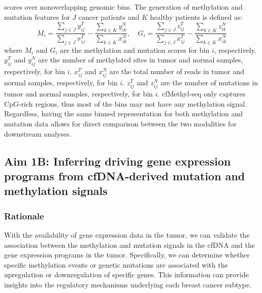 \documentclass[11pt]{article}
\begin{document}
scores over nonoverlapping genomic bins.
The generation of methylation and mutation features for $J$ cancer patients and $K$ healthy patients is defined as:
\begin{equation}
	M_{i} = \frac{\sum\limits_{j \in J}{y^{T}_{ij}}}{\sum\limits_{j \in J}{x^{T}_{ij}}} - 
	\frac{\sum\limits_{k \in K}{y^{N}_{ik}}}{\sum\limits_{k \in K}{x^{N}_{ik}}},
	\quad
	G_{i} = \frac{\sum\limits_{j \in J}{z^{T}_{ij}}}{\sum\limits_{j \in J}{x^{T}_{ij}}} - 
	\frac{\sum\limits_{k \in K}{z^{N}_{ik}}}{\sum\limits_{k \in K}{x^{N}_{ik}}}
\end{equation}
where $M_{i}$ and $G_{i}$ are the methylation and mutation scores for bin $i$, respectively. $y^{T}_{ij}$ and $y^{N}_{ij}$ are the number of methylated sites in tumor and normal samples, respectively, for bin $i$. $x^{T}_{ij}$ and $x^{N}_{ij}$ are the total number of reads in tumor and normal samples, respectively, for bin $i$. $z^{T}_{ij}$ and $z^{N}_{ij}$ are the number of mutations in tumor and normal samples, respectively, for bin $i$. cfMethyl-seq only captures CpG-rich regions, thus most of the bins 
may not have any methylation signal.
Regardless, having the same binned representation for both methylation and mutation data allows for direct comparison between the two modalities for downstream analyses.

\subsection*{Aim 1B: Inferring driving gene expression programs from cfDNA-derived mutation and methylation signals}
\subsubsection*{Rationale}
With the availability of gene expression data in the tumor, we can validate the association between the methylation and mutation signals in the cfDNA and the gene expression programs in the tumor. Specifically, we can determine whether specific methylation events or genetic mutations are associated with the upregulation or downregulation of specific genes. This information can provide insights into the regulatory mechanisms underlying each breast cancer subtype.
\end{document}
